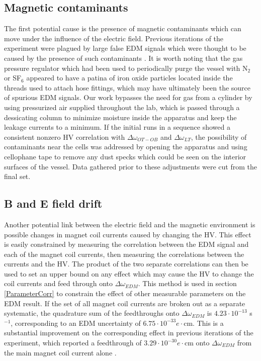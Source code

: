 \documentclass [10pt, twoside] {uwthesis}[2012/04/02]
\begin{document}
\subsection{Magnetic contaminants}
The first potential cause is the presence of magnetic contaminants which can move under the influence of the electric field. Previous iterations of the experiment were plagued by large false EDM signals which were thought to be caused by the presence of such contaminants \cite[Appendix C]{Griffith}. It is worth noting that the gas pressure regulator which had been used to periodically purge the vessel with N$_2$ or SF$_6$ appeared to have a patina of iron oxide particles located inside the threads used to attach hose fittings, which may have ultimately been the source of spurious EDM signals. Our work bypasses the need for gas from a cylinder by using pressurized air supplied throughout the lab, which is passed through a dessicating column to minimize moisture inside the apparatus and keep the leakage currents to a minimum. If the initial runs in a sequence showed a consistent nonzero HV correlation with $\Delta\omega_{OT-OB}$ and $\Delta\omega_{LT}$, the possibility of contaminants near the cells was addressed by opening the apparatus and using cellophane tape to remove any dust specks which could be seen on the interior surfaces of the vessel. Data gathered prior to these adjustments were cut from the final set. 

\subsection{B and E field drift}
Another potential link between the electric field and the magnetic environment is possible changes in magnet coil currents caused by changing the HV. This effect is easily constrained by measuring the correlation between the EDM signal and each of the magnet coil currents, then measuring the correlations between the currents and the HV. The product of the two separate correlations can then be used to set an upper bound on any effect which may cause the HV to change the coil currents and feed through onto $\Delta\omega_{EDM}$. This method is used in section \ref{ParameterCorr} to constrain the effect of other measurable parameters on the EDM result. If the set of all magnet coil currents are broken out as a separate systematic, the quadrature sum of the feedthroughs onto $\Delta\omega_{EDM}$ is $4.23 \cdot 10^{-13}$ s$^{-1}$, corresponding to an EDM uncertainty of $6.75 \cdot 10^{-33} e\cdot \text{cm}$. This is a substantial improvement on the corresponding effect in previous iterations of the experiment, which reported a feedthrough of $3.29 \cdot 10^{-30} e\cdot \text{cm}$ onto $\Delta\omega_{EDM}$ from the main magnet coil current alone \cite{2013_Hg_EDM_PRA}.
\end{document}
